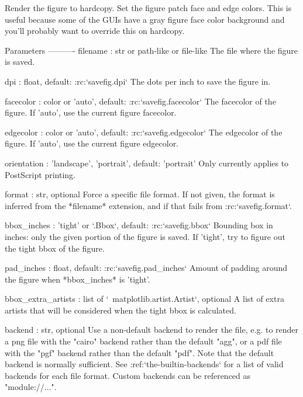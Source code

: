 \begin{DoxyVerb}Render the figure to hardcopy. Set the figure patch face and edge
colors.  This is useful because some of the GUIs have a gray figure
face color background and you'll probably want to override this on
hardcopy.

Parameters
----------
filename : str or path-like or file-like
    The file where the figure is saved.

dpi : float, default: :rc:`savefig.dpi`
    The dots per inch to save the figure in.

facecolor : color or 'auto', default: :rc:`savefig.facecolor`
    The facecolor of the figure.  If 'auto', use the current figure
    facecolor.

edgecolor : color or 'auto', default: :rc:`savefig.edgecolor`
    The edgecolor of the figure.  If 'auto', use the current figure
    edgecolor.

orientation : {'landscape', 'portrait'}, default: 'portrait'
    Only currently applies to PostScript printing.

format : str, optional
    Force a specific file format. If not given, the format is inferred
    from the *filename* extension, and if that fails from
    :rc:`savefig.format`.

bbox_inches : 'tight' or `.Bbox`, default: :rc:`savefig.bbox`
    Bounding box in inches: only the given portion of the figure is
    saved.  If 'tight', try to figure out the tight bbox of the figure.

pad_inches : float, default: :rc:`savefig.pad_inches`
    Amount of padding around the figure when *bbox_inches* is 'tight'.

bbox_extra_artists : list of `~matplotlib.artist.Artist`, optional
    A list of extra artists that will be considered when the
    tight bbox is calculated.

backend : str, optional
    Use a non-default backend to render the file, e.g. to render a
    png file with the "cairo" backend rather than the default "agg",
    or a pdf file with the "pgf" backend rather than the default
    "pdf".  Note that the default backend is normally sufficient.  See
    :ref:`the-builtin-backends` for a list of valid backends for each
    file format.  Custom backends can be referenced as "module://...".
\end{DoxyVerb}
 \mbox{\label{classmatplotlib_1_1backend__bases_1_1FigureCanvasBase_a023527795c83440f326f5a0ae4821829}} 
